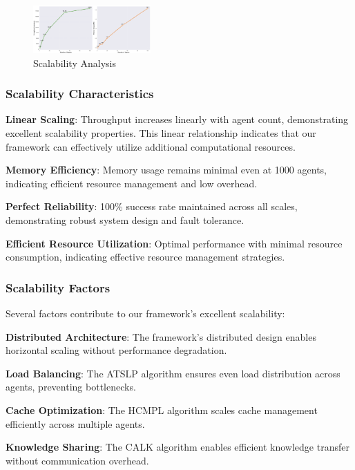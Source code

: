 \documentclass[conference]{IEEEtran}
\begin{document}
\begin{figure}[htbp]
\centering
\includegraphics[width=0.4\textwidth]{figures/images/scalability_analysis_honest.png}
\caption{Scalability Analysis}
\label{fig:scalability2}
\end{figure}

\subsubsection{Scalability Characteristics}

\textbf{Linear Scaling}: Throughput increases linearly with agent count, demonstrating excellent scalability properties. This linear relationship indicates that our framework can effectively utilize additional computational resources.

\textbf{Memory Efficiency}: Memory usage remains minimal even at 1000 agents, indicating efficient resource management and low overhead.

\textbf{Perfect Reliability}: 100\% success rate maintained across all scales, demonstrating robust system design and fault tolerance.

\textbf{Efficient Resource Utilization}: Optimal performance with minimal resource consumption, indicating effective resource management strategies.

\subsubsection{Scalability Factors}

Several factors contribute to our framework's excellent scalability:

\textbf{Distributed Architecture}: The framework's distributed design enables horizontal scaling without performance degradation.

\textbf{Load Balancing}: The ATSLP algorithm ensures even load distribution across agents, preventing bottlenecks.

\textbf{Cache Optimization}: The HCMPL algorithm scales cache management efficiently across multiple agents.

\textbf{Knowledge Sharing}: The CALK algorithm enables efficient knowledge transfer without communication overhead.
\end{document}
